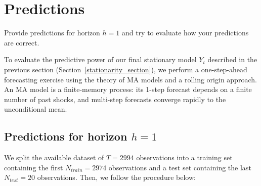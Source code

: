 \documentclass[11pt, a4paper]{article}
\begin{document}
\section{Predictions}

\begin{questionbox}
    Provide predictions for horizon $h = 1$ and try to evaluate how your predictions are correct.
\end{questionbox}

To evaluate the predictive power of our final stationary model $Y_t$ described in the previous section (Section~\ref{stationarity_section}), we perform a one-step-ahead forecasting exercise using the theory of MA models and a rolling origin approach. An MA model is a finite-memory process: its 1-step forecast depends on a finite number of past shocks, and multi-step forecasts converge rapidly to the unconditional mean.

\subsection{Predictions for horizon $h = 1$}

We split the available dataset of $T=2994$ observations into a training set containing the first $N_{train}=2974$ observations and a test set containing the last $N_{test}=20$ observations. Then, we follow the procedure below:
\end{document}
